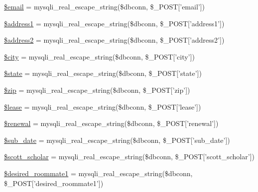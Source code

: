 \begin{DoxyCompactItemize}
\item 
\hyperlink{admin__view_2validate_2studentVal_8php_ad634f418b20382e2802f80532d76d3cd}{\$email} = mysqli\-\_\-real\-\_\-escape\-\_\-string(\$dbconn, \$\-\_\-\-P\-O\-S\-T\mbox{[}'email'\mbox{]})
\item 
\hyperlink{admin__view_2validate_2studentVal_8php_a653579f1800dead9ae026af236859831}{\$address1} = mysqli\-\_\-real\-\_\-escape\-\_\-string(\$dbconn, \$\-\_\-\-P\-O\-S\-T\mbox{[}'address1'\mbox{]})
\item 
\hyperlink{admin__view_2validate_2studentVal_8php_a914305af9ec7e49528f07f35a8e8c6a9}{\$address2} = mysqli\-\_\-real\-\_\-escape\-\_\-string(\$dbconn, \$\-\_\-\-P\-O\-S\-T\mbox{[}'address2'\mbox{]})
\item 
\hyperlink{admin__view_2validate_2studentVal_8php_a5b9ddd3e3a69d8901270064346bdef49}{\$city} = mysqli\-\_\-real\-\_\-escape\-\_\-string(\$dbconn, \$\-\_\-\-P\-O\-S\-T\mbox{[}'city'\mbox{]})
\item 
\hyperlink{admin__view_2validate_2studentVal_8php_ae82306c4f2d17d8dd5c7d8d916b33bed}{\$state} = mysqli\-\_\-real\-\_\-escape\-\_\-string(\$dbconn, \$\-\_\-\-P\-O\-S\-T\mbox{[}'state'\mbox{]})
\item 
\hyperlink{admin__view_2validate_2studentVal_8php_aa91be3142812d8cd4221c6f54555079b}{\$zip} = mysqli\-\_\-real\-\_\-escape\-\_\-string(\$dbconn, \$\-\_\-\-P\-O\-S\-T\mbox{[}'zip'\mbox{]})
\item 
\hyperlink{admin__view_2validate_2studentVal_8php_ae95126b1133cf958aaf8a31b0283364c}{\$lease} = mysqli\-\_\-real\-\_\-escape\-\_\-string(\$dbconn, \$\-\_\-\-P\-O\-S\-T\mbox{[}'lease'\mbox{]})
\item 
\hyperlink{admin__view_2validate_2studentVal_8php_a1a67d224b0f0712693c41c17f2c85183}{\$renewal} = mysqli\-\_\-real\-\_\-escape\-\_\-string(\$dbconn, \$\-\_\-\-P\-O\-S\-T\mbox{[}'renewal'\mbox{]})
\item 
\hyperlink{admin__view_2validate_2studentVal_8php_a08dd3f8caa6a5a9037559298cfd9e5cc}{\$sub\-\_\-date} = mysqli\-\_\-real\-\_\-escape\-\_\-string(\$dbconn, \$\-\_\-\-P\-O\-S\-T\mbox{[}'sub\-\_\-date'\mbox{]})
\item 
\hyperlink{admin__view_2validate_2studentVal_8php_aeba3fa7111a05390371249cf7515b517}{\$scott\-\_\-scholar} = mysqli\-\_\-real\-\_\-escape\-\_\-string(\$dbconn, \$\-\_\-\-P\-O\-S\-T\mbox{[}'scott\-\_\-scholar'\mbox{]})
\item 
\hyperlink{admin__view_2validate_2studentVal_8php_a9c454efdb922da9127af82e94ee399a1}{\$desired\-\_\-roommate1} = mysqli\-\_\-real\-\_\-escape\-\_\-string(\$dbconn, \$\-\_\-\-P\-O\-S\-T\mbox{[}'desired\-\_\-roommate1'\mbox{]})

\end{DoxyCompactItemize}
